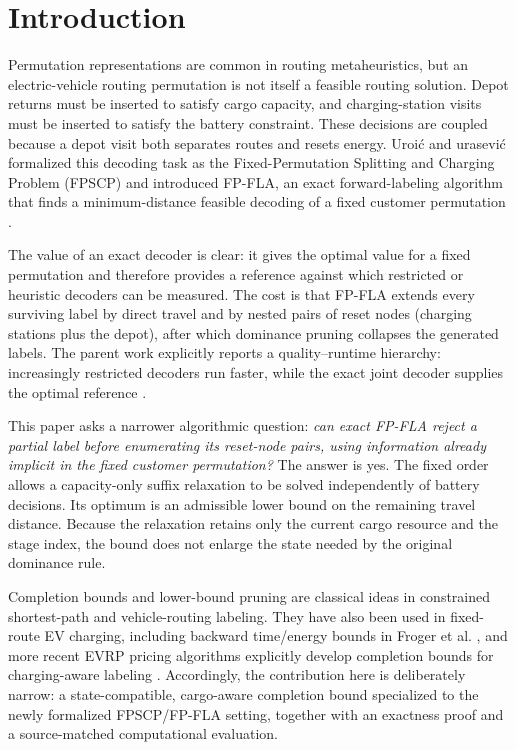 \documentclass[11pt]{article}
\begin{document}
\section{Introduction}
Permutation representations are common in routing metaheuristics, but an electric-vehicle routing permutation is not itself a feasible routing solution. Depot returns must be inserted to satisfy cargo capacity, and charging-station visits must be inserted to satisfy the battery constraint. These decisions are coupled because a depot visit both separates routes and resets energy. Uroi\'c and \DJ urasevi\'c formalized this decoding task as the Fixed-Permutation Splitting and Charging Problem (FPSCP) and introduced FP-FLA, an exact forward-labeling algorithm that finds a minimum-distance feasible decoding of a fixed customer permutation \cite{uroic2026}.

The value of an exact decoder is clear: it gives the optimal value for a fixed permutation and therefore provides a reference against which restricted or heuristic decoders can be measured. The cost is that FP-FLA extends every surviving label by direct travel and by nested pairs of reset nodes (charging stations plus the depot), after which dominance pruning collapses the generated labels. The parent work explicitly reports a quality--runtime hierarchy: increasingly restricted decoders run faster, while the exact joint decoder supplies the optimal reference \cite{uroic2026}.

This paper asks a narrower algorithmic question: \emph{can exact FP-FLA reject a partial label before enumerating its reset-node pairs, using information already implicit in the fixed customer permutation?} The answer is yes. The fixed order allows a capacity-only suffix relaxation to be solved independently of battery decisions. Its optimum is an admissible lower bound on the remaining travel distance. Because the relaxation retains only the current cargo resource and the stage index, the bound does not enlarge the state needed by the original dominance rule.

Completion bounds and lower-bound pruning are classical ideas in constrained shortest-path and vehicle-routing labeling. They have also been used in fixed-route EV charging, including backward time/energy bounds in Froger et al. \cite{froger2019}, and more recent EVRP pricing algorithms explicitly develop completion bounds for charging-aware labeling \cite{enerback2024}. Accordingly, the contribution here is deliberately narrow: a state-compatible, cargo-aware completion bound specialized to the newly formalized FPSCP/FP-FLA setting, together with an exactness proof and a source-matched computational evaluation.
\end{document}
